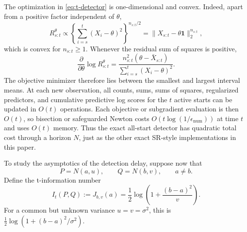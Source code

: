 \documentclass[12pt]{article}
\theoremstyle{spaced}
\theoremstyle{remark}
\begin{document}
The optimization in \eqref{eq:t-detector} is one-dimensional and convex.
Indeed, apart from a positive factor independent of $\theta$,
\[
  R_{s:t}^{\theta}
  \propto
  \left\{\sum_{i=s}^t(X_i-\theta)^2\right\}^{n_{s:t}/2}
  =\|X_{s:t}-\theta\mathbf 1\|_2^{n_{s:t}},
\]
which is convex for $n_{s:t}\ge1$.  Whenever the residual sum of squares is
positive,
\begin{equation}
\label{eq:UI-t-derivative}
  \frac{\partial}{\partial\theta}\log R_{s:t}^{\theta}
  =
  \frac{n_{s:t}^2(\theta-\bar X_{s:t})}
       {\sum_{i=s}^t(X_i-\theta)^2}.
\end{equation}
The objective minimizer therefore lies between the smallest and largest
interval means.  At each new observation, all counts, sums, sums of squares,
regularized predictors, and cumulative predictive log scores for the $t$
active starts can be updated in $O(t)$ operations.  Each objective or
subgradient evaluation is then $O(t)$, so bisection or safeguarded Newton
costs $O(t\log(1/\epsilon_{\mathrm{num}}))$ at time $t$ and uses $O(t)$
memory.  Thus the exact all-start detector has quadratic total cost through a
horizon $N$, just as the other exact SR-style implementations in this paper.


To study the asymptotics of the detection delay, suppose now that
\[
  P=N(a,u),
  \qquad
  Q=N(b,v),
  \qquad a\ne b.
\]
Define the t-information number
\begin{equation}
\label{eq:t-information}
  I_t(P,Q)
  :=J_{b,v}(a)
  =\frac12\log\left(1+\frac{(b-a)^2}{v}\right).
\end{equation}
For a common but unknown variance $u=v=\sigma^2$, this is
$\tfrac12\log(1+(b-a)^2/\sigma^2)$.
\end{document}
